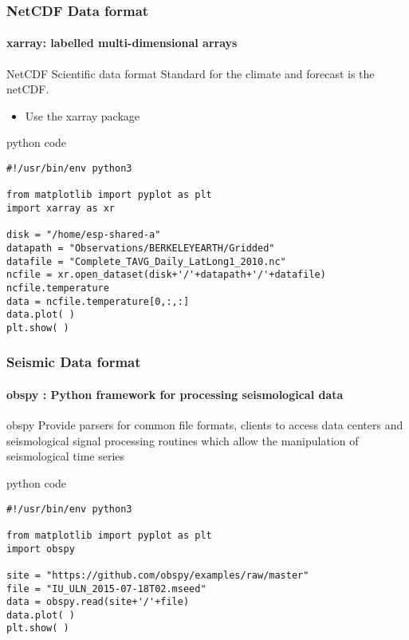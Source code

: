 \documentclass[unknownkeysallowed, 10pt, a4 paper, handout]{beamer}
\begin{document}
\begin{frame}[fragile=singleslide]
  \frametitle{NetCDF Data format}
  \framesubtitle{xarray: labelled multi-dimensional arrays}

  \begin{exampleblock}{NetCDF Scientific data format}
     Standard for the climate and forecast is the netCDF.
    \begin{itemize}
       \item Use the xarray package
    \end{itemize}
  \end{exampleblock}

  \begin{exampleblock}{python code}
    \small{
    \begin{verbatim}
#!/usr/bin/env python3

from matplotlib import pyplot as plt
import xarray as xr

disk = "/home/esp-shared-a"
datapath = "Observations/BERKELEYEARTH/Gridded"
datafile = "Complete_TAVG_Daily_LatLong1_2010.nc"
ncfile = xr.open_dataset(disk+'/'+datapath+'/'+datafile)
ncfile.temperature
data = ncfile.temperature[0,:,:]
data.plot( )
plt.show( )
    \end{verbatim}
  }
  \end{exampleblock}
\end{frame}


\begin{frame}[fragile=singleslide]
  \frametitle{Seismic Data format}
  \framesubtitle{obspy : Python framework for processing seismological data}

  \begin{exampleblock}{obspy}
     Provide parsers for common file formats, clients to access data centers and
     seismological signal processing routines which allow the manipulation of
     seismological time series
  \end{exampleblock}

  \begin{exampleblock}{python code}
    \small{
    \begin{verbatim}
#!/usr/bin/env python3

from matplotlib import pyplot as plt
import obspy

site = "https://github.com/obspy/examples/raw/master"
file = "IU_ULN_2015-07-18T02.mseed"
data = obspy.read(site+'/'+file)
data.plot( )
plt.show( )
    \end{verbatim}
    }
  \end{exampleblock}

\end{frame}
\end{document}
